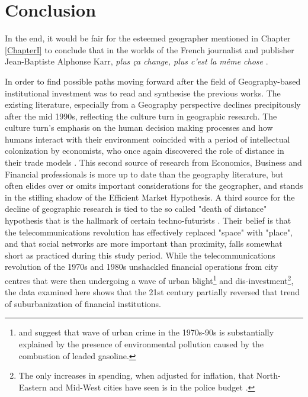 \chapter {Conclusion}
In the end, it would be fair for the esteemed geographer mentioned in Chapter \ref{ChapterI} to conclude that in the worlds of the French journalist and publisher Jean-Baptiste Alphonse Karr, \textit{plus \c{c}a change, plus c'est la m\^{e}me chose} \citep[p.278]{Karr1864}.

In order to find possible paths moving forward after the field of Geography-based institutional investment was to read and synthesise the previous works.  The existing literature, especially from a Geography perspective declines precipitously after the mid 1990s, reflecting the culture turn in geographic research.  The culture turn's emphasis on the human decision making processes and how humans interact with their environment coincided with a period of intellectual colonization by economists, who once again discovered the role of distance in their trade models \citep{scotta2004}.  This second source of research from Economics, Business and Financial professionals is more up to date than the geography literature, but often elides over or omits important considerations for the geographer, and stands in the stifling shadow of the Efficient Market Hypothesis.  A third source for the decline of geographic research is tied to the so called "death of distance" hypothesis that is the hallmark of certain techno-futurists \citep{Obrian1992}.  Their belief is that the telecommunications revolution has effectively replaced "space" with "place", and that social networks are more important than proximity, falls somewhat short as practiced during this study period.  While the telecommunications revolution of the 1970s and 1980s unshackled financial operations from city centres that were then undergoing a wave of urban blight\footnote{ \cite{feigenbaum2016lead} and \cite{NBERw23392} suggest that wave of urban crime in the 1970s-90s is substantially explained by the presence of environmental pollution caused by the combustion of leaded gasoline.}  and dis-investment\footnote{The only increases in spending, when adjusted for inflation, that North-Eastern and Mid-West cities have seen is in the police budget \citep{derenoncourt2019can}.}, the data examined here shows that the 21st century partially reversed that trend of suburbanization of financial institutions.   


